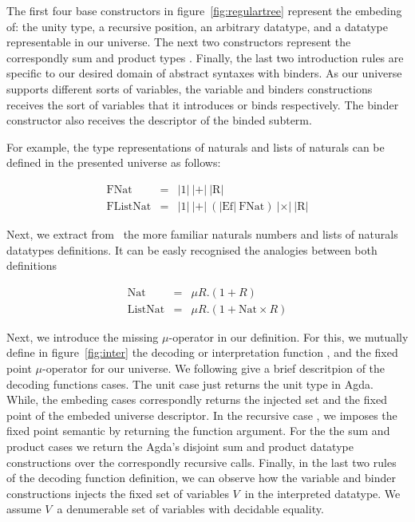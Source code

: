 \documentclass{book}
\begin{document}
The first four base constructors in figure~\ref{fig:regulartree} represent the embeding of: the unity type, a recursive position, an arbitrary datatype, and a datatype representable in our universe. The next two constructors represent the correspondly sum and product types . Finally, the last two introduction rules are specific to our desired domain of abstract syntaxes with binders. As our universe supports different sorts of variables, the variable and binders constructions receives the sort of variables that it introduces or binds respectively. The binder constructor also receives the descriptor of the binded subterm. 

For example, the type representations of naturals and lists of naturals can be defined in the presented universe as follows:

\[
\begin{array}{rcl}
  \text{FNat} &=& |1|\ |{+}|\ \text{|R|} \\
  \text{FListNat} &=& |1|\ |{+}|\ (\text{|Ef|}\ \text{FNat})\ |{\times}|\ \text{|R|}
\end{array} \]

Next, we extract from~\cite{Pierce:2002} the more familiar naturals numbers and lists of naturals datatypes definitions. It can be easly recognised the analogies between both definitions

\[
\begin{array}{rcl}
 \text{Nat} &=& \mu R . (1 + R)  \\
 \text{ListNat} &=& \mu R . (1 + \text{Nat} \times R)
\end{array} 
\]

 Next, we introduce the missing $\mu$-operator in our definition. For this, we mutually define in figure~\ref{fig:inter} the decoding or interpretation function , and the fixed point $\mu$-operator for our universe. We following give a brief descritpion of the decoding functions cases. The unit case  just returns the unit type in Agda. While, the embeding cases correspondly returns the injected set and the fixed point of the embeded universe descriptor. In the recursive case , we imposes the fixed point semantic by returning the  function argument. For the the sum and product cases we return the Agda's disjoint sum and product datatype constructions over the correspondly recursive calls. Finally, in the last two rules of the decoding function definition, we can observe how the variable and binder constructions injects the fixed set of variables $V$\ in the interpreted datatype. We assume $V$\ a denumerable set of variables with decidable equality. 
\end{document}
